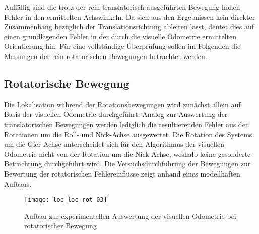 Auffällig sind die trotz der rein translatorisch ausgeführten Bewegung hohen Fehler in den ermittelten Achswinkeln. Da sich aus den Ergebnissen kein direkter Zusammenhang bezüglich der Translationsrichtung ableiten lässt, deutet dies auf einen grundlegenden Fehler in der durch die visuelle Odometrie ermittelten Orientierung hin. Für eine vollständige Überprüfung sollen im Folgenden die Messungen der rein rotatorischen Bewegungen betrachtet werden.


\subsection{Rotatorische Bewegung}

Die Lokalisation während der Rotationsbewegungen wird zunächst allein auf Basis der visuellen Odometrie durchgeführt. Analog zur Auswertung der translatorischen Bewegungen werden lediglich die resultierenden Fehler aus den Rotationen um die Roll- und Nick-Achse ausgewertet. Die Rotation des Systems um die Gier-Achse unterscheidet sich für den Algorithmus der visuellen Odometrie nicht von der Rotation um die Nick-Achse, weshalb keine gesonderte Betrachtung durchgeführt wird. Die Versuchsdurchführung der Bewegungen zur Bewertung der rotatorischen Fehlereinflüsse zeigt  anhand eines modellhaften Aufbaus.\\

\begin{figure}[!ht]
	\begin{center}
		\texttt{[image: loc\_loc\_rot\_03]}
		\caption{Aufbau zur experimentellen Auswertung der visuellen Odometrie bei rotatorischer Bewegung}
		\label{fig.rotmove}
	\end{center}
\end{figure}

